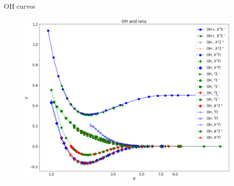 \documentclass{beamer}
\begin{document}
%

\begin{frame}{OH curves}
    \begin{figure}[h]
        \centering
        \includegraphics[scale=0.27]{img/OH_and_ions.png}
        \label{fig:oh}
    \end{figure}
\end{frame}
\end{document}
